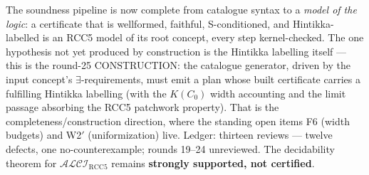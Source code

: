 \documentclass[11pt]{article}
\newcommand{\ALCIRCC}{\mathcal{ALCI}_{\mathrm{RCC5}}}
\begin{document}
The soundness pipeline is now complete from catalogue syntax to a
\emph{model of the logic}: a certificate that is wellformed,
faithful, S-conditioned, and Hintikka-labelled is an RCC5 model of its
root concept, every step kernel-checked.  The one hypothesis not yet
produced by construction is the Hintikka labelling itself --- this is
the round-25 CONSTRUCTION: the catalogue generator, driven by the
input concept's $\exists$-requirements, must emit a plan whose built
certificate carries a fulfilling Hintikka labelling (with the
$K(C_0)$ width accounting and the limit passage absorbing the RCC5
patchwork property).  That is the completeness/construction direction,
where the standing open items F6 (width budgets) and W2$'$
(uniformization) live.  Ledger: thirteen reviews --- twelve defects,
one no-counterexample; rounds 19--24 unreviewed.  The decidability
theorem for $\ALCIRCC$ remains \textbf{strongly supported, not
certified}.
\end{document}
